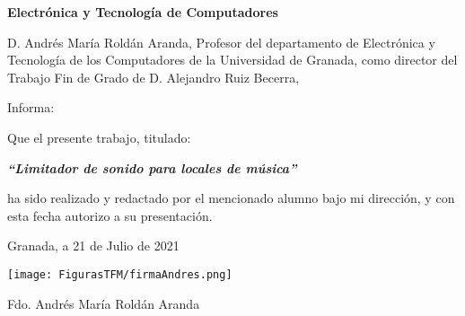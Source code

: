 \begin{center}
\textbf{Electrónica y Tecnología de Computadores}
\par\end{center}

\begin{center}
\vfill
\par\end{center}

\vspace*{1.5cm}

\newpage
\thispagestyle{empty}
\noindent
\blankpage

\clearpage
\thispagestyle{empty}
{}

\noindent D. Andrés María Roldán Aranda, Profesor del departamento
de Electrónica y Tecnología de los Computadores de la Universidad
de Granada, como director del Trabajo Fin de Grado de D. Alejandro Ruiz Becerra,

\vspace*{1cm}

Informa:

\begin{doublespace}
Que el presente trabajo, titulado:
\end{doublespace}

\begin{doublespace}
\begin{center}
\textbf{\emph{\large {}``Limitador de sonido para locales de música''}}
\par\end{center}{\large \par}
\end{doublespace}

\noindent ha sido realizado y redactado por el mencionado alumno bajo
mi dirección, y con esta fecha autorizo a su presentación.

\vspace*{1cm}

\begin{center}
Granada, a 21 de Julio de 2021
\par\end{center}

\bigskip
\bigskip
\begin{center}
\texttt{[image: FigurasTFM/firmaAndres.png]}
\end{center}

\begin{center}
\begin{doublespace}
Fdo. Andrés María Roldán Aranda
\end{doublespace}
\end{center}

